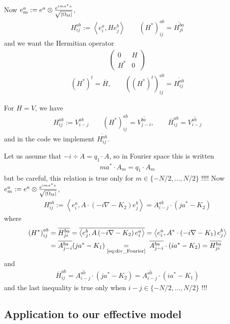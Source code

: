 \documentclass[11pt,a4paper,reqno,french,tikz]{amsart}
\newcommand{\pa}[1]{\left( #1 \right)} %
\newcommand{\ab}[1]{\left|#1\right|} %
\newcommand{\ps}[1]{\left< #1 \right>} %
\newcommand{\na}{\nabla} %
\newcommand{\f}[2]{\frac{#1}{#2}} %
\newcommand{\ind}[1]{_{\textup{#1}}} %
\newcommand{\mat}[1]{\begin{pmatrix} #1 \end{pmatrix}} %
\newcommand{\sqom}{\sqrt{\ab{\Omega\ind{M}}}}
\begin{document}
Now $e_m^a := e^a \otimes \f{e^{i ma^* x}}{\sqom}$,
\begin{align*}
H_{ij}^{ab} := \ps{e_i^a, H e^b_j}\qquad \pa{H^*}^{ab}_{ij} = \overline{H^{ba}_{ji}}
\end{align*}
and we want the Hermitian operator
\begin{align*}
	\mat{0 & H \\ H^* & 0}
\end{align*}
\begin{align*}
\pa{H^*}^t = \overline{H}, \qquad \pa{\pa{H^*}^t}^{ab}_{ij} = \overline{H^{ab}_{ij}}
\end{align*}


For $H = V$, we have
\begin{align*}
H_{ij}^{ab} := V^{ab}_{i-j} \qquad \pa{H^*}^{ab}_{ij} = \overline{V^{ba}_{j-i}},\qquad \overline{H}^{ab}_{ij} = \overline{V^{ab}_{i-j}}
\end{align*}
and in the code we implement $\overline{H^{ab}_{ij}}$.



Let us assume that $-i\div A = q_1 \cdot A$, so in Fourier space this is written
\begin{align}\label{eq:div_Fourier}
	ma^* \cdot A_m = q_1 \cdot A_m
\end{align}
but be careful, this relation is true only for $m \in \{-N/2,\dots,N/2\}$ !!!! Now $e_m^a := e^a \otimes \f{e^{i ma^* x}}{\sqom}$,
\begin{align*}
H_{ij}^{ab} := \ps{e_i^a, A \cdot \pa{-i\na - K_2} e^b_j} = A_{i-j}^{ab} \cdot (ja^* -K_2)
\end{align*}
where
\begin{align*}
	\pa{H^*}^{ab}_{ij} &= \overline{H^{ba}_{ji}} = \overline{\ps{e^b_j, A\pa{-i\na -K_2} e^a_i}} =\ps{e_i^a, A^* \cdot \pa{-i\na -K_1}e^b_j} \\
&= \overline{A^{ba}_{j-i}}(ja^* -K_1) \underset{\substack{\refeq{eq:div_Fourier}}}{=} \; \overline{A^{ba}_{j-i}} \cdot \pa{ia^* -K_2} = \overline{H^{ba}_{ji}}
\end{align*}
and
\begin{align*}
\overline{H}^{ab}_{ij} = \overline{A_{i-j}^{ab}} \cdot (ja^* -K_2) = \overline{A_{i-j}^{ab}} \cdot (ia^* -K_1)
\end{align*}
and the last inequality is true only when $i-j \in \{-N/2,\dots,N/2\}$ !!!


\subsection{Application to our effective model}%
\label{sub:application_to_our_effective_model}
\end{document}

